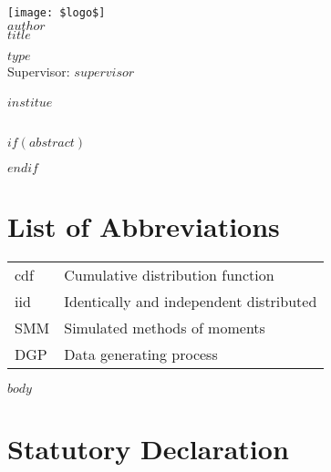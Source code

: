 \documentclass[a4paper, bibtotocnumbered,liststotoc,12pt]{scrartcl}
\theoremstyle{definition}
\theoremstyle{remark}
\numberwithin{figure}{section}
\numberwithin{table}{section}
\numberwithin{equation}{section}
\begin{document}
\setcounter{page}{0}
\begin{titlepage}
\begin{center}
\texttt{[image: \$logo\$]}\\
\vspace{\fill}
\large{$author$}\\
\Huge{$title$}
\end{center}
\vspace{\fill}
\large{$type$} \\
\large{Supervisor: $supervisor$}\\
\vspace{\fill}\\ 
$institue$\\
\\

\end{titlepage}

$if(abstract)$
  \begin{abstract}
  $abstract$
  \end{abstract}
$endif$




\newpage %
\tableofcontents %
\newpage
\thispagestyle{plain}
\listoffigures %
\listoftables %

\section*{List of Abbreviations}
\begin{tabular}{ll}
	cdf & Cumulative distribution function\\
	iid & Identically and independent distributed\\
	SMM & Simulated methods of moments\\
	DGP & Data generating process
\end{tabular}
\newpage



$body$


\newpage
\printbibliography





\newpage
\thispagestyle{plain}
\section{Statutory Declaration}
\end{document}
